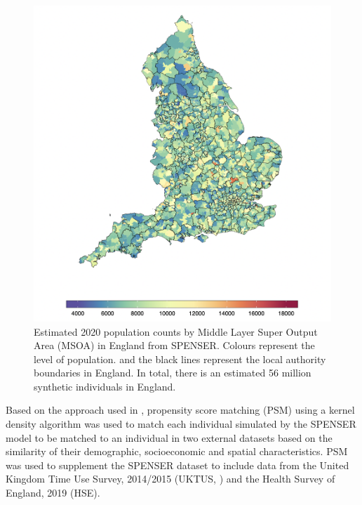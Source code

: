 \documentclass{article}
\begin{document}
\begin{figure}[ht]
    \centering
    \includegraphics[width = 12cm]{Figures/SPENSER-England.png}
    \caption{Estimated 2020 population counts by Middle Layer Super Output Area (MSOA) in England from SPENSER. Colours represent the level of population. and the black lines represent the local authority boundaries in England. In total, there is an estimated 56 million synthetic individuals in England.} \label{fig::SPENSER}
\end{figure}

\noindent Based on the approach used in \citet{morrissey2015mental}, propensity score matching (PSM) using a kernel density algorithm was used to match each individual simulated by the SPENSER model to be matched to an individual in two external datasets based on the similarity of their demographic, socioeconomic and spatial characteristics. PSM was used to supplement the SPENSER dataset to include data from the United Kingdom Time Use Survey, 2014/2015 (UKTUS, \cite{uktus}) and the Health Survey of England, 2019 (HSE). \\
\end{document}
